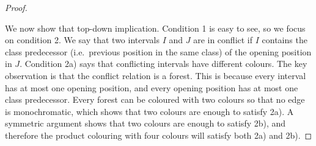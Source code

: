 {\begin{proof}
\begin{itemize}
\end{itemize}
We now show that top-down implication. Condition 1 is easy to see, so we focus on condition 2. We say that two intervals $I$ and $J$ are in conflict if $I$ contains the class predecessor (i.e.~previous position in the same class) of the opening position in $J$. Condition 2a) says that conflicting intervals have different colours. The key observation is that the conflict relation is a forest. This is because every interval has at most one opening position, and every opening position has at most one class predecessor. Every forest can be coloured with two colours so that no edge is monochromatic, which shows that two colours are enough to satisfy 2a). A symmetric argument shows that two colours are enough to satisfy 2b), and therefore the product colouring with four colours will satisfy both 2a) and 2b). 
\end{proof}
}


